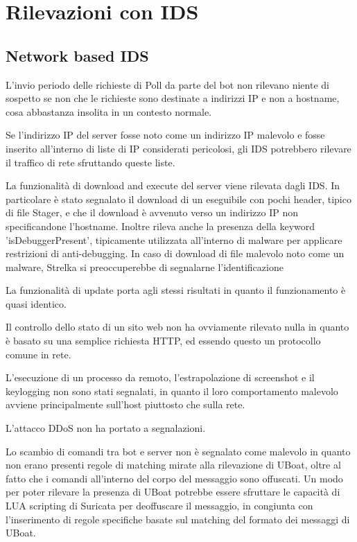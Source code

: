 \section{Rilevazioni con IDS}
\subsection{Network based IDS}
L'invio periodo delle richieste di Poll da parte del bot non rilevano niente  di sospetto se non che le richieste sono destinate a indirizzi IP e non a hostname, cosa abbastanza insolita in un contesto normale.

Se l'indirizzo IP del server fosse noto come un indirizzo IP malevolo e fosse inserito all'interno di liste di IP considerati pericolosi, gli IDS  potrebbero rilevare il traffico di rete sfruttando queste liste. 

\medskip

La funzionalità di download and execute del server viene rilevata dagli IDS. In particolare è stato segnalato il download di un eseguibile con pochi header, tipico di file Stager, e che il download è avvenuto verso un indirizzo IP non specificandone l'hostname. Inoltre rileva anche la presenza della keyword 'isDebuggerPresent', tipicamente utilizzata all'interno di malware per applicare restrizioni di anti-debugging.
In caso di download di file malevolo noto come un malware, Strelka si preoccuperebbe di segnalarne l'identificazione

La funzionalità di update porta agli stessi risultati in quanto il funzionamento è quasi identico.

\medskip

Il controllo dello stato di un sito web non ha ovviamente rilevato nulla in quanto è basato su una semplice richiesta HTTP, ed essendo questo un protocollo comune in rete.

\medskip
L'esecuzione di un processo da remoto, l'estrapolazione di screenshot e il keylogging non sono stati segnalati, in quanto il loro comportamento malevolo avviene principalmente  sull'host piuttosto che sulla rete.

\medskip

L'attacco DDoS non ha portato a segnalazioni.

\medskip
Lo scambio di comandi tra bot e server non è segnalato come malevolo in quanto non erano presenti regole di matching mirate alla rilevazione di UBoat, oltre al fatto che i comandi all'interno del corpo del messaggio sono offuscati.
Un modo per poter rilevare la presenza di UBoat potrebbe essere sfruttare le capacità di LUA scripting di Suricata per deoffuscare il messaggio, in congiunta con l'inserimento di regole specifiche basate sul matching del formato dei messaggi di UBoat.

